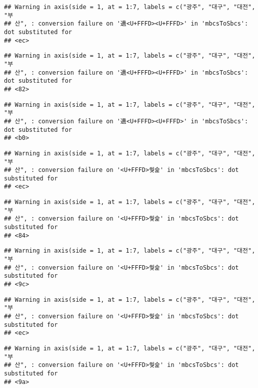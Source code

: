 \documentclass[]{article}
\begin{document}
\begin{verbatim}
## Warning in axis(side = 1, at = 1:7, labels = c("광주", "대구", "대전", "부
## 산", : conversion failure on '遺<U+FFFD><U+FFFD>' in 'mbcsToSbcs': dot substituted for
## <ec>
\end{verbatim}

\begin{verbatim}
## Warning in axis(side = 1, at = 1:7, labels = c("광주", "대구", "대전", "부
## 산", : conversion failure on '遺<U+FFFD><U+FFFD>' in 'mbcsToSbcs': dot substituted for
## <82>
\end{verbatim}

\begin{verbatim}
## Warning in axis(side = 1, at = 1:7, labels = c("광주", "대구", "대전", "부
## 산", : conversion failure on '遺<U+FFFD><U+FFFD>' in 'mbcsToSbcs': dot substituted for
## <b0>
\end{verbatim}

\begin{verbatim}
## Warning in axis(side = 1, at = 1:7, labels = c("광주", "대구", "대전", "부
## 산", : conversion failure on '<U+FFFD>쒖슱' in 'mbcsToSbcs': dot substituted for
## <ec>
\end{verbatim}

\begin{verbatim}
## Warning in axis(side = 1, at = 1:7, labels = c("광주", "대구", "대전", "부
## 산", : conversion failure on '<U+FFFD>쒖슱' in 'mbcsToSbcs': dot substituted for
## <84>
\end{verbatim}

\begin{verbatim}
## Warning in axis(side = 1, at = 1:7, labels = c("광주", "대구", "대전", "부
## 산", : conversion failure on '<U+FFFD>쒖슱' in 'mbcsToSbcs': dot substituted for
## <9c>
\end{verbatim}

\begin{verbatim}
## Warning in axis(side = 1, at = 1:7, labels = c("광주", "대구", "대전", "부
## 산", : conversion failure on '<U+FFFD>쒖슱' in 'mbcsToSbcs': dot substituted for
## <ec>
\end{verbatim}

\begin{verbatim}
## Warning in axis(side = 1, at = 1:7, labels = c("광주", "대구", "대전", "부
## 산", : conversion failure on '<U+FFFD>쒖슱' in 'mbcsToSbcs': dot substituted for
## <9a>
\end{verbatim}
\end{document}
